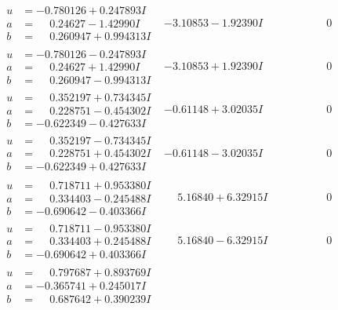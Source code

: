\documentclass[1p]{elsarticle_modified}
\theoremstyle{definition}
\begin{document}
$$\begin{array}{c|c|c}
\begin{aligned}
u &= -0.780126 + 0.247893 I \\
a &= \phantom{-}0.24627 - 1.42990 I \\
b &= \phantom{-}0.260947 + 0.994313 I\end{aligned}
 & -3.10853 - 1.92390 I & \phantom{-0.000000 } 0 \\ \hline\begin{aligned}
u &= -0.780126 - 0.247893 I \\
a &= \phantom{-}0.24627 + 1.42990 I \\
b &= \phantom{-}0.260947 - 0.994313 I\end{aligned}
 & -3.10853 + 1.92390 I & \phantom{-0.000000 } 0 \\ \hline\begin{aligned}
u &= \phantom{-}0.352197 + 0.734345 I \\
a &= \phantom{-}0.228751 - 0.454302 I \\
b &= -0.622349 - 0.427633 I\end{aligned}
 & -0.61148 + 3.02035 I & \phantom{-0.000000 } 0 \\ \hline\begin{aligned}
u &= \phantom{-}0.352197 - 0.734345 I \\
a &= \phantom{-}0.228751 + 0.454302 I \\
b &= -0.622349 + 0.427633 I\end{aligned}
 & -0.61148 - 3.02035 I & \phantom{-0.000000 } 0 \\ \hline\begin{aligned}
u &= \phantom{-}0.718711 + 0.953380 I \\
a &= \phantom{-}0.334403 - 0.245488 I \\
b &= -0.690642 - 0.403366 I\end{aligned}
 & \phantom{-}5.16840 + 6.32915 I & \phantom{-0.000000 } 0 \\ \hline\begin{aligned}
u &= \phantom{-}0.718711 - 0.953380 I \\
a &= \phantom{-}0.334403 + 0.245488 I \\
b &= -0.690642 + 0.403366 I\end{aligned}
 & \phantom{-}5.16840 - 6.32915 I & \phantom{-0.000000 } 0 \\ \hline\begin{aligned}
u &= \phantom{-}0.797687 + 0.893769 I \\
a &= -0.365741 + 0.245017 I \\
b &= \phantom{-}0.687642 + 0.390239 I\end{aligned}

\end{array}$$
\end{document}

